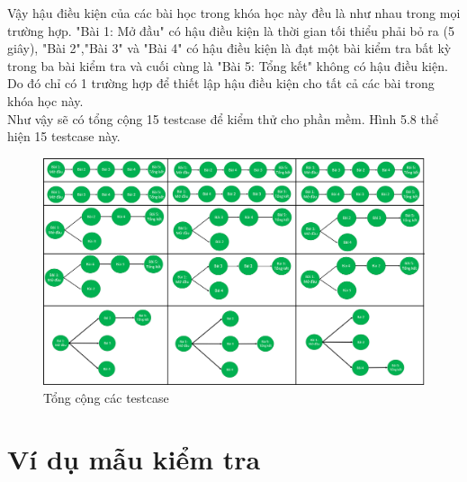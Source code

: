 Vậy hậu điều kiện của các bài học trong khóa học này đều là như nhau trong mọi trường hợp. "Bài 1: Mở đầu" có hậu điều kiện là thời gian tối thiểu phải bỏ ra (5 giây), "Bài 2","Bài 3" và "Bài 4" có hậu điều kiện là đạt một bài kiểm tra bất kỳ trong ba bài kiểm tra và cuối cùng là "Bài 5: Tổng kết" không có hậu điều kiện. Do đó chỉ có 1 trường hợp để thiết lập hậu điều kiện cho tất cả các bài trong khóa học này.\\

Như vậy sẽ có tổng cộng 15 testcase để kiểm thử cho phần mềm. Hình 5.8 thể hiện 15 testcase này.

\begin{center}
	\begin{figure}[htp]
		\begin{center}
			\includegraphics[width=16cm]{Chapter5/Pictures/picture58.png}
		\end{center}
		\caption{Tổng cộng các testcase}
		\label{refhinhchuong66}
	\end{figure}
\end{center}


\newpage

\section{Ví dụ mẫu kiểm tra}


